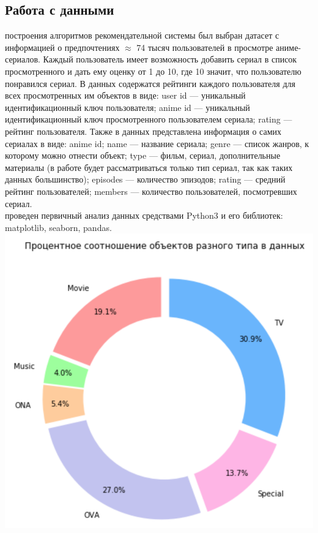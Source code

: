 \documentclass{article}
\newcommand\tab[1][1cm]{\hspace*{#1}}
\begin{document}
\subsection{Работа с данными}
 построения алгоритмов рекомендательной системы был выбран датасет с информацией о предпочтениях $\approx$ 74 тысяч пользователей в просмотре аниме-сериалов. Каждый пользователь имеет возможность добавить сериал в список просмотренного и дать ему оценку от 1 до 10, где 10 значит, что пользователю понравился сериал. В данных содержатся рейтинги каждого пользователя для всех просмотренных им объектов в виде: user id — уникальный идентификационный ключ пользователя; anime id — уникальный идентификационный ключ просмотренного пользователем сериала; rating — рейтинг пользователя. Также в данных представлена информация о самих сериалах в виде: anime id; name — название сериала; genre — список жанров, к которому можно отнести объект; type — фильм, сериал, дополнительные материалы (в работе будет рассматриваться только тип сериал, так как таких данных большинство); episodes — количество эпизодов; rating — средний рейтинг пользователей; members — количество пользователей, посмотревших сериал.\\
 проведен первичный анализ данных средствами Python3 и его библиотек: matplotlib, seaborn, pandas.\\
\includegraphics[scale=0.8]{f3.png}\\
\end{document}
